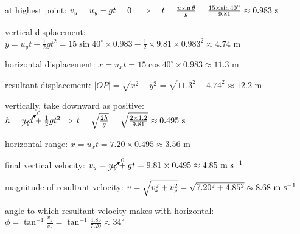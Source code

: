 \sol at highest point: $v_y = u_y - gt = 0 \quad \Rightarrow \quad t = \frac{u\sin\theta}{g} = \frac{15\times\sin40^\circ}{9.81} \approx 0.983 \text{ s}$

vertical displacement: $y = u_y t - \frac{1}{2}gt^2 = 15\sin40^\circ \times 0.983 - \frac{1}{2}\times 9.81 \times 0.983^2 \approx 4.74 \text{ m}$

horizontal displacement: $x = u_x t = 15\cos40^\circ \times 0.983 \approx 11.3 \text{ m}$

resultant displacement: $|OP| = \sqrt{x^2 +y^2} = \sqrt{11.3^2 + 4.74^2} \approx 12.2 \text{ m}$ \eoe

\newpage


\sol vertically, take downward as positive: $h = \cancelto{0}{u_y t} + \frac{1}{2}gt^2 \, \Rightarrow \, t = \sqrt{\frac{2h}{g}} = \sqrt{\frac{2\times1.2}{9.81}} \approx 0.495 \text{ s} $

horizontal range: $x = u_x t = 7.20 \times 0.495 \approx 3.56 \text{ m}$

final vertical velocity: $v_y = \cancelto{0}{u_y} + gt = 9.81 \times 0.495 \approx 4.85 \text{ m s$^{-1}$}$

magnitude of resultant velocity: $v = \sqrt{v_x^2 + v_y^2} = \sqrt{7.20^2 + 4.85^2} \approx 8.68 \text{ m s$^{-1}$}$

angle to which resultant velocity makes with horizontal: $\phi = \tan^{-1}\frac{v_y}{v_x} = \tan^{-1}\frac{4.85}{7.20} \approx 34^\circ$ \eoe


